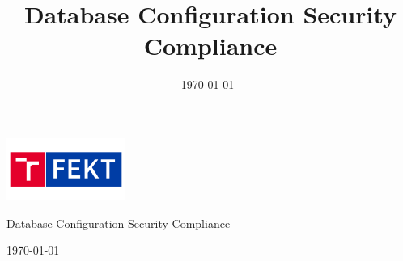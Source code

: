 \documentclass{article}
\title{Database Configuration Security Compliance}
\date{\today\ \currenttime}
\begin{document}
\begin{titlepage}
\centering
{}
\includegraphics[width=39mm]{imgs/fekt.png}\\[1cm]
{\Huge Database Configuration Security Compliance\par}
\vspace{1cm}
{\Large\today\ \currenttime\par}
\end{titlepage}




\newpage

\newpage

\newpage



\newpage





\end{document}
